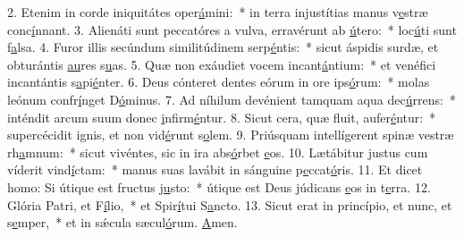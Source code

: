 2. Etenim in corde iniquitátes oper\uline{á}mini:~* in terra injustítias manus v\uline{e}stræ conc\uline{í}nnant.
3. Alienáti sunt peccatóres a vulva, erravérunt ab \uline{ú}tero:~* loc\uline{ú}ti sunt f\uline{a}lsa.
4. Furor illis secúndum similitúdinem serp\uline{é}ntis:~* sicut áspidis surdæ, et obturántis \uline{au}res s\uline{u}as.
5. Quæ non exáudiet vocem incant\uline{á}ntium:~* et venéfici incantántis s\uline{a}pi\uline{é}nter.
6. Deus cónteret dentes eórum in ore ips\uline{ó}rum:~* molas leónum confr\uline{í}nget D\uline{ó}minus.
7. Ad níhilum devénient tamquam aqua dec\uline{ú}rrens:~* inténdit arcum suum donec \uline{i}nfirm\uline{é}ntur.
8. Sicut cera, quæ fluit, aufer\uline{é}ntur:~* supercécidit ignis, et non vid\uline{é}runt s\uline{o}lem.
9. Priúsquam intellígerent spinæ vestræ rh\uline{a}mnum:~* sicut vivéntes, sic in ira abs\uline{ó}rbet \uline{e}os.
10. Lætábitur justus cum víderit vind\uline{í}ctam:~* manus suas lavábit in sánguine p\uline{e}ccat\uline{ó}ris.
11. Et dicet homo: Si útique est fructus j\uline{u}sto:~* útique est Deus júdicans \uline{e}os in t\uline{e}rra.
12. Glória Patri, et F\uline{í}lio,~* et Spir\uline{í}tui S\uline{a}ncto.
13. Sicut erat in princípio, et nunc, et s\uline{e}mper,~* et in sǽcula sæcul\uline{ó}rum. \uline{A}men.
